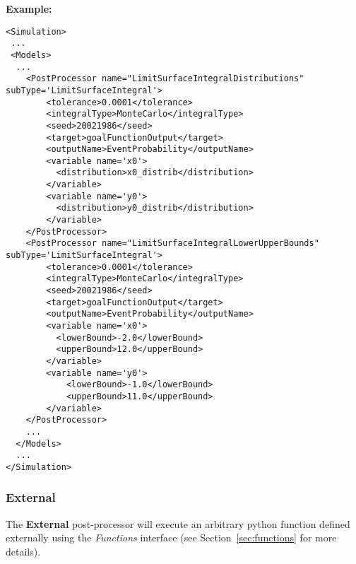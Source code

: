 \textbf{Example:}
\begin{lstlisting}[style=XML,morekeywords={name,subType,debug,class,type}]
<Simulation>
 ...
 <Models>
  ...
    <PostProcessor name="LimitSurfaceIntegralDistributions" subType='LimitSurfaceIntegral'>
        <tolerance>0.0001</tolerance>
        <integralType>MonteCarlo</integralType>
        <seed>20021986</seed>
        <target>goalFunctionOutput</target>
        <outputName>EventProbability</outputName>
        <variable name='x0'>
          <distribution>x0_distrib</distribution>
        </variable>
        <variable name='y0'>
          <distribution>y0_distrib</distribution>
        </variable>
    </PostProcessor>
    <PostProcessor name="LimitSurfaceIntegralLowerUpperBounds" subType='LimitSurfaceIntegral'>
        <tolerance>0.0001</tolerance>
        <integralType>MonteCarlo</integralType>
        <seed>20021986</seed>
        <target>goalFunctionOutput</target>
        <outputName>EventProbability</outputName>
        <variable name='x0'>
          <lowerBound>-2.0</lowerBound>
          <upperBound>12.0</upperBound>
        </variable>
        <variable name='y0'>
            <lowerBound>-1.0</lowerBound>
            <upperBound>11.0</upperBound>
        </variable>
    </PostProcessor>
    ...
  </Models>
  ...
</Simulation>
\end{lstlisting}



\subsubsection{External}
\label{External}
The \textbf{External} post-processor will execute an arbitrary python function
defined externally using the \textit{Functions} interface (see
Section~\ref{sec:functions} for more details).
%


